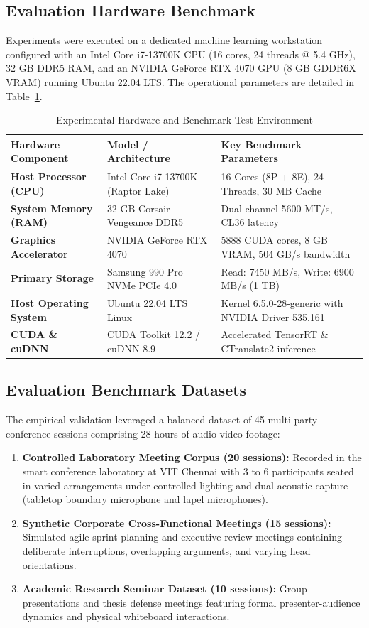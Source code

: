 \documentclass[12pt,a4paper,oneside]{report}
\begin{document}
\subsection{Evaluation Hardware Benchmark}
Experiments were executed on a dedicated machine learning workstation configured with an Intel Core i7-13700K CPU (16 cores, 24 threads @ 5.4 GHz), 32 GB DDR5 RAM, and an NVIDIA GeForce RTX 4070 GPU (8 GB GDDR6X VRAM) running Ubuntu 22.04 LTS. The operational parameters are detailed in Table~\ref{tab:hardware_benchmarks}.

\begin{table}[htbp]
\centering
\caption{Experimental Hardware and Benchmark Test Environment}
\label{tab:hardware_benchmarks}
\fontsize{9}{11}\selectfont
\begin{tabularx}{\textwidth}{@{}l p{4.2cm} X@{}}
\toprule
\textbf{Hardware Component} & \textbf{Model / Architecture} & \textbf{Key Benchmark Parameters} \\
\midrule
\textbf{Host Processor (CPU)} & Intel Core i7-13700K (Raptor Lake) & 16 Cores (8P + 8E), 24 Threads, 30 MB Cache \\
\textbf{System Memory (RAM)} & 32 GB Corsair Vengeance DDR5 & Dual-channel 5600 MT/s, CL36 latency \\
\textbf{Graphics Accelerator} & NVIDIA GeForce RTX 4070 & 5888 CUDA cores, 8 GB VRAM, 504 GB/s bandwidth \\
\textbf{Primary Storage} & Samsung 990 Pro NVMe PCIe 4.0 & Read: 7450 MB/s, Write: 6900 MB/s (1 TB) \\
\textbf{Host Operating System} & Ubuntu 22.04 LTS Linux & Kernel 6.5.0-28-generic with NVIDIA Driver 535.161 \\
\textbf{CUDA \& cuDNN} & CUDA Toolkit 12.2 / cuDNN 8.9 & Accelerated TensorRT \& CTranslate2 inference \\
\bottomrule
\end{tabularx}
\end{table}

\subsection{Evaluation Benchmark Datasets}
The empirical validation leveraged a balanced dataset of 45 multi-party conference sessions comprising 28 hours of audio-video footage:
\begin{enumerate}
    \item \textbf{Controlled Laboratory Meeting Corpus (20 sessions):} Recorded in the smart conference laboratory at VIT Chennai with 3 to 6 participants seated in varied arrangements under controlled lighting and dual acoustic capture (tabletop boundary microphone and lapel microphones).
    \item \textbf{Synthetic Corporate Cross-Functional Meetings (15 sessions):} Simulated agile sprint planning and executive review meetings containing deliberate interruptions, overlapping arguments, and varying head orientations.
    \item \textbf{Academic Research Seminar Dataset (10 sessions):} Group presentations and thesis defense meetings featuring formal presenter-audience dynamics and physical whiteboard interactions.
\end{enumerate}
\end{document}
